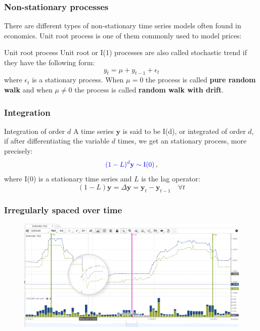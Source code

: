 \documentclass{beamer}
\begin{document}
\begin{frame}
\frametitle{Non-stationary processes}
There are different types of non-stationary time series models often found in economics. Unit root process is one of them commonly used to model prices:
\begin{block}{Unit root process}
{\color{red}Unit root or I(1)} processes are also called stochastic trend if they have the following form:
{\color{blue}
\[
y_t = \mu + y_{t-1} + \epsilon_t
\]}
\noindent where $\epsilon_t$ is a stationary process. When $\mu = 0 $ the process is called {\bf pure random walk} and when $\mu \neq 0$  the process is called {\bf random walk with drift}.
\end{block}
\end{frame}


\begin{frame}
\frametitle{Integration }
\begin{block}{Integration of order $d$}
A time series $\mathbf{y}$ is said to be I(d), or integrated of order $d$, if after
differentiating the variable $d$ times, we get an stationary process, more precisely:
\[
{\color{blue}
(1-L)^d \mathbf{y} \sim \text{I(0)}} \, ,
\]
\noindent where I(0) is a stationary time series and $L$ is the lag operator:
\[
(1-L)\mathbf{y} = \Delta \mathbf{y}=\mathbf{y}_t  -\mathbf{y}_{t-1} \quad \forall t
\]
\end{block}
\end{frame}

\begin{frame}
\frametitle{Irregularly spaced over time}
\begin{figure}
\includegraphics[width=0.8\paperwidth]{img/hft-ticks-zoom.png}
\end{figure}
\end{frame}
\end{document}
